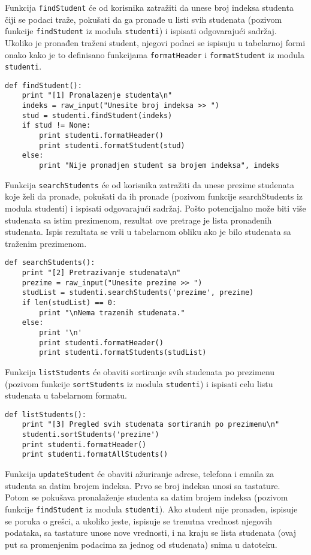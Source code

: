 \documentclass[a4paper]{article}
\begin{document}
Funkcija \texttt{findStudent} će od korisnika zatražiti da unese broj indeksa
studenta čiji se podaci traže, pokušati da ga pronađe u listi svih studenata
(pozivom funkcije \texttt{findStudent} iz modula \texttt{studenti}) i ispisati
odgovarajući sadržaj. Ukoliko je pronađen traženi student, njegovi podaci se
ispisuju u tabelarnoj formi onako kako je to definisano funkcijama
\texttt{formatHeader} i \texttt{formatStudent} iz modula \texttt{studenti}.

\begin{verbatim}
def findStudent():
    print "[1] Pronalazenje studenta\n"
    indeks = raw_input("Unesite broj indeksa >> ")
    stud = studenti.findStudent(indeks)
    if stud != None:
        print studenti.formatHeader()
        print studenti.formatStudent(stud)
    else:
        print "Nije pronadjen student sa brojem indeksa", indeks
\end{verbatim}

Funkcija \texttt{searchStudents} će od korisnika zatražiti da unese prezime
studenata koje želi da pronađe, pokušati da ih pronađe (pozivom funkcije
searchStudents iz modula studenti) i ispisati odgovarajući sadržaj. Pošto
potencijalno može biti više studenata sa istim prezimenom, rezultat ove pretrage
je lista pronađenih studenata. Ispis rezultata se vrši u tabelarnom obliku ako
je bilo studenata sa traženim prezimenom.

\begin{verbatim}
def searchStudents():
    print "[2] Pretrazivanje studenata\n"
    prezime = raw_input("Unesite prezime >> ")
    studList = studenti.searchStudents('prezime', prezime)
    if len(studList) == 0:
        print "\nNema trazenih studenata."
    else:
        print '\n'
        print studenti.formatHeader()
        print studenti.formatStudents(studList)
\end{verbatim}

Funkcija \texttt{listStudents} će obaviti sortiranje svih studenata po prezimenu
(pozivom funkcije \texttt{sortStudents} iz modula \texttt{studenti}) i ispisati
celu listu studenata u tabelarnom formatu.

\begin{verbatim}
def listStudents():
    print "[3] Pregled svih studenata sortiranih po prezimenu\n"
    studenti.sortStudents('prezime')
    print studenti.formatHeader()
    print studenti.formatAllStudents()
\end{verbatim}

Funkcija \texttt{updateStudent} će obaviti ažuriranje adrese, telefona i emaila
za studenta sa datim brojem indeksa. Prvo se broj indeksa unosi sa tastature.
Potom se pokušava pronalaženje studenta sa datim brojem indeksa (pozivom
funkcije \texttt{findStudent} iz modula \texttt{studenti}). Ako student nije
pronađen, ispisuje se poruka o grešci, a ukoliko jeste, ispisuje se trenutna
vrednost njegovih podataka, sa tastature unose nove vrednosti, i na kraju se
lista studenata (ovaj put sa promenjenim podacima za jednog od studenata) snima
u datoteku.
\end{document}
